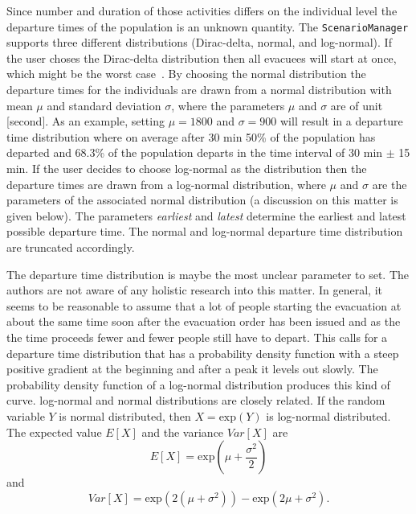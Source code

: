 \begin{itemize}
Since number and duration of those activities differs on the individual level the departure times of the population is an unknown quantity. The \lstinline+ScenarioManager+ supports three different distributions (Dirac-delta, normal, and log-normal). If the user choses the Dirac-delta distribution then all evacuees will start at once, which might be the worst case~\citep{LaemmelKluepfel2012InfluenceOfDepartureTimeDistribution}. By choosing the normal distribution the departure times for the individuals are drawn from a normal distribution with mean $\mu$ and standard deviation $\sigma$, where the parameters $\mu$ and $\sigma$ are of unit [second]. As an example, setting $\mu = 1800$ and $\sigma =  900$ will result in a departure time distribution where on average after 30 min 50\% of the population has departed and 68.3\% of the population departs in the time interval of 30 min $\pm$ 15 min. If the user decides to choose log-normal as the distribution then the departure times are drawn from a log-normal distribution, where $\mu$ and $\sigma$ are the parameters of the associated normal distribution (a discussion on this matter is given below). The parameters \emph{earliest} and \emph{latest} determine the earliest and latest possible departure time. The normal and log-normal departure time distribution are truncated accordingly.
\end{itemize}
The departure time distribution is maybe the most unclear parameter to set. The authors are not aware of any holistic research into this matter. 
In general, it seems to be reasonable to assume that a lot of people starting the evacuation at about the same time soon after the evacuation order has been issued and as the the time proceeds fewer and fewer people still have to depart. 
This calls for a departure time distribution that has a probability density function with a steep positive gradient at the beginning and after a peak it levels out slowly. The probability density function of a log-normal distribution produces this kind of curve. log-normal and normal distributions are closely related. If the random variable $Y$ is normal distributed, then $X = \text{exp}(Y)$ is log-normal distributed. The expected value $E[X]$  and the variance $Var[X]$ are
\begin{equation}
E[X] = \text{exp}(\mu + \frac{\sigma^2}{2})
\end{equation}
and 
\begin{equation}
Var[X]=\text{exp}(2(\mu+\sigma^2))-\text{exp}(2\mu+\sigma^2).
\end{equation}
